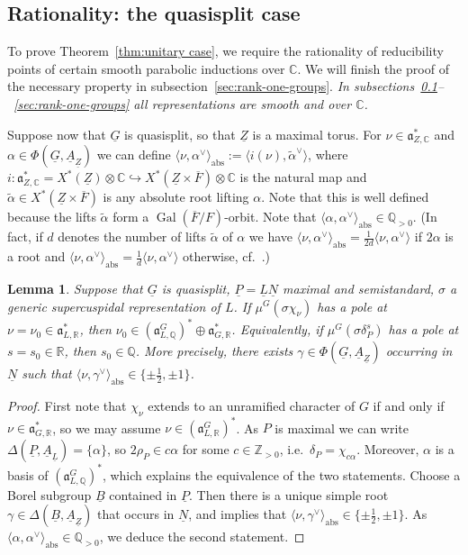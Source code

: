 \documentclass[a4paper]{amsart}
\numberwithin{equation}{section}
\newtheorem{lem}[thm]{Lemma}
\theoremstyle{remark}
\theoremstyle{definition}
\DeclareMathOperator{\Gal}{Gal}
\newcommand{\C}{\mathbb{C}}
\newcommand{\Z}{\mathbb{Z}}
\newcommand{\Q}{\mathbb{Q}}
\newcommand{\R}{\mathbb{R}}
\newcommand{\alggrp}[1]{\underline{#1}}
\newcommand{\abs}{\mathrm{abs}}
\newcommand{\ang}[1]{\langle #1\rangle}
\newcommand{\into}{\hookrightarrow}
\begin{document}
\subsection{Rationality: the quasisplit case}
\label{sec:rati-quasisplit}
To prove Theorem~\ref{thm:unitary case}, we require the rationality of reducibility points of certain smooth parabolic inductions over $\C$.
We will finish the proof of the necessary property in subsection~\ref{sec:rank-one-groups}.
\emph{In subsections~\ref{sec:rati-quasisplit}--~\ref{sec:rank-one-groups} all representations are smooth and over $\C$.}

Suppose now that $\alggrp G$ is quasisplit, so that $\alggrp Z$ is a maximal torus.
For $\nu \in \mathfrak{a}_{Z,\C}^*$ and $\alpha \in \Phi(\alggrp G,\alggrp A_{\alggrp Z})$ we can define $\ang{\nu,\alpha^\vee}_{\abs} := \ang{i(\nu),\widetilde{\alpha}^\vee}$, where $i \colon \mathfrak{a}_{Z,\C}^* = X^*(\alggrp Z) \otimes \C \into X^*(\alggrp Z \times \overline{F}) \otimes \C$ is the natural map and $\widetilde{\alpha} \in X^*(\alggrp Z \times \overline{F})$ is any absolute root lifting $\alpha$.
Note that this is well defined because the lifts $\widetilde{\alpha}$ form a $\Gal(\overline{F}/F)$-orbit. 
Note that $\ang{\alpha,\alpha^\vee}_{\abs} \in \Q_{>0}$.
(In fact, if $d$ denotes the number of lifts $\widetilde{\alpha}$ of $\alpha$ we have $\ang{\nu,\alpha^\vee}_{\abs} = \frac 1{2d}\ang{\nu,\alpha^\vee}$ if $2\alpha$ is a root and $\ang{\nu,\alpha^\vee}_{\abs} = \frac 1{d}\ang{\nu,\alpha^\vee}$ otherwise, cf.\ \cite[Lemma A.9]{MR4397148}.)

\begin{lem}\label{lm:rationality-supercusp}
  Suppose that $\alggrp{G}$ is quasisplit, $\alggrp{P} = \alggrp{L}\alggrp{N}$ maximal and semistandard, $\sigma$ a generic supercuspidal representation of $L$.
  If $\mu^G(\sigma \chi_\nu)$ has a pole at $\nu = \nu_0 \in \mathfrak{a}_{L,\R}^*$, then $\nu_0 \in (\mathfrak{a}^G_{L,\Q})^* \oplus \mathfrak{a}_{G,\R}^*$.
  Equivalently, if $\mu^G(\sigma \delta_P^s)$ has a pole at $s = s_0 \in \R$, then $s_0 \in \Q$.
  More precisely, there exists $\gamma \in \Phi(\alggrp G,\alggrp A_{\alggrp Z})$ occurring in $\alggrp N$ such that $\ang{\nu,\gamma^\vee}_{\abs} \in \{\pm \frac 12,\pm 1\}$.
\end{lem}

\begin{proof}
  First note that $\chi_\nu$ extends to an unramified character of $G$ if and only if $\nu \in \mathfrak{a}_{G,\R}^*$, so we may assume $\nu \in (\mathfrak{a}^{G}_{L,\R})^*$.
  As $P$ is maximal we can write $\Delta(\alggrp{P},\alggrp{A}_{\alggrp{L}}) = \{\alpha\}$, so $2\rho_P \in c \alpha$ for some $c \in \Z_{>0}$, i.e.\ $\delta_P = \chi_{c\alpha}$.
  Moreover, $\alpha$ is a basis of $(\mathfrak{a}^G_{L,\Q})^*$, which explains the equivalence of the two statements.
  Choose a Borel subgroup $\alggrp B$ contained in $\alggrp P$.
  Then there is a unique simple root $\gamma \in \Delta(\alggrp B,\alggrp A_{\alggrp Z})$ that occurs in $\alggrp N$,
  and \cite[Theorem~8.1]{MR1070599} implies that $\ang{\nu,\gamma^\vee}_{\abs} \in \{\pm \frac 12,\pm 1\}$.
  As $\ang{\alpha,\alpha^\vee}_{\abs} \in \Q_{>0}$, we deduce the second statement.
\end{proof}
\end{document}
